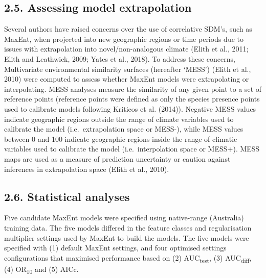 \documentclass[12pt,]{article}
\begin{document}
\hypertarget{assessing-model-extrapolation}{%
\subsection{2.5. Assessing model
extrapolation}\label{assessing-model-extrapolation}}

Several authors have raised concerns over the use of correlative SDM's,
such as MaxEnt, when projected into new geographic regions or time
periods due to issues with extrapolation into novel/non-analogous
climate (Elith et al., 2011; Elith and Leathwick, 2009; Yates et al.,
2018). To address these concerns, Multivariate environmental similarity
surfaces (hereafter `MESS') (Elith et al., 2010) were computed to assess
whether MaxEnt models were extrapolating or interpolating. MESS analyses
measure the similarity of any given point to a set of reference points
(reference points were defined as only the species presence points used
to calibrate models following Kriticos et al. (2014)). Negative MESS
values indicate geographic regions outside the range of climate
variables used to calibrate the model (i.e.~extrapolation space or
MESS-), while MESS values between 0 and 100 indicate geographic regions
inside the range of climatic variables used to calibrate the model
(i.e.~interpolation space or MESS+). MESS maps are used as a measure of
prediction uncertainty or caution against inferences in extrapolation
space (Elith et al., 2010).

\hypertarget{statistical-analyses}{%
\subsection{2.6. Statistical analyses}\label{statistical-analyses}}

Five candidate MaxEnt models were specified using native-range
(Australia) training data. The five models differed in the feature
classes and regularisation multiplier settings used by MaxEnt to build
the models. The five models were specified with (1) default MaxEnt
settings, and four optimised settings configurations that maximised
performance based on (2) AUC\textsubscript{test}, (3)
AUC\textsubscript{diff}, (4) OR\textsubscript{10} and (5) AICc.
\end{document}
